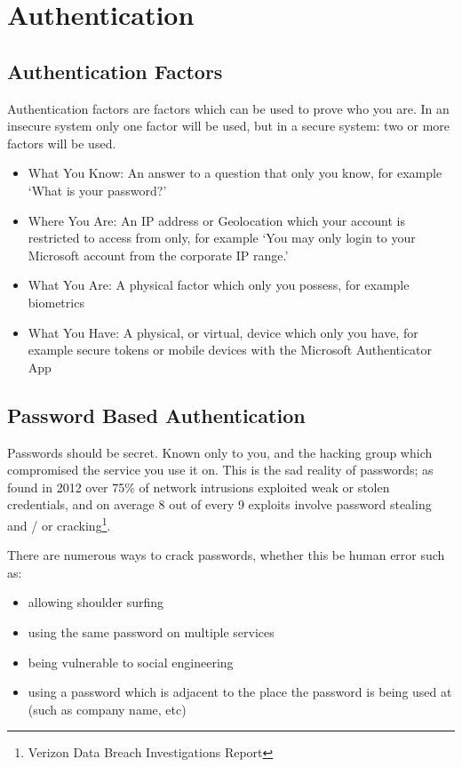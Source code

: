 \section{Authentication}

\subsection{Authentication Factors}
Authentication factors are factors which can be used to prove who you are. In an insecure system only one factor will be used, but in a secure system: two or more factors will be used. 

\begin{itemize}
    \item What You Know: An answer to a question that only you know, for example `What is your password?'
    \item Where You Are: An IP address or Geolocation which your account is restricted to access from only, for example `You may only login to your Microsoft account from the corporate IP range.'
    \item What You Are: A physical factor which only you possess, for example biometrics
    \item What You Have: A physical, or virtual, device which only you have, for example secure tokens or mobile devices with the Microsoft Authenticator App
\end{itemize}

\subsection{Password Based Authentication}
Passwords should be secret. Known only to you, and the hacking group which compromised the service you use it on. This is the sad reality of passwords; as found in 2012 over 75\% of network intrusions exploited weak or stolen credentials, and on average 8 out of every 9 exploits involve password stealing and / or cracking\footnote{Verizon Data Breach Investigations Report}. 

There are numerous ways to crack passwords, whether this be human error such as:
\begin{itemize}
    \item allowing shoulder surfing
    \item using the same password on multiple services
    \item being vulnerable to social engineering
    \item using a password which is adjacent to the place the password is being used at (such as company name, etc)
\end{itemize}

